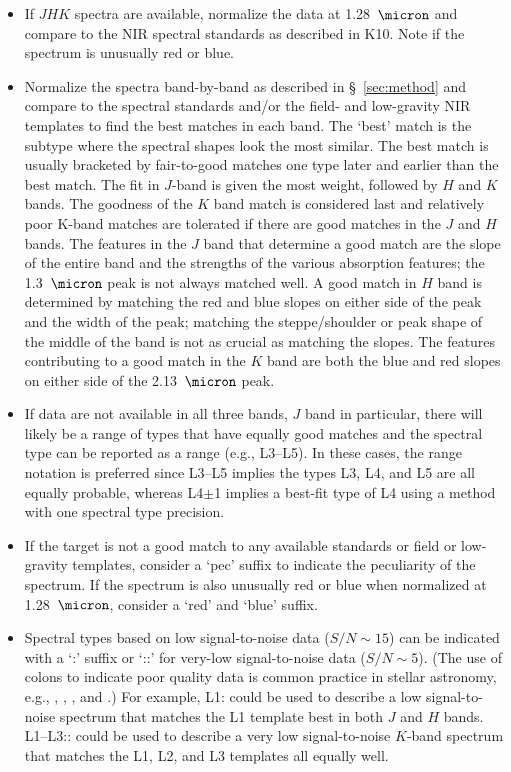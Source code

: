 \documentclass[12pt,preprint]{aastex}
\begin{document}
\begin{itemize}
	\item If $JHK$ spectra are available, normalize the data at 1.28~$\micron$ and compare to the NIR spectral standards as described in K10. Note if the spectrum is unusually red or blue.
	
	\item Normalize the spectra band-by-band as described in \S~\ref{sec:method} and compare to the spectral standards and/or the field- and low-gravity NIR templates to find the best matches in each band.
	The `best' match is the subtype where the spectral shapes look the most similar. The best match is usually bracketed by fair-to-good matches one type later and earlier than the best match.
	The fit in $J$-band is given the most weight, followed by $H$ and $K$ bands. The goodness of the $K$ band match is considered last and relatively poor K-band matches are tolerated if there are good matches in the $J$ and $H$ bands. 
	The features in the $J$ band that determine a good match are the slope of the entire band and the strengths of the various absorption features; the 1.3~$\micron$ peak is not always matched well. 
	A good match in $H$ band is determined by matching the red and blue slopes on either side of the peak and the width of the peak; matching the steppe/shoulder or peak shape of the middle of the band is not as crucial as matching the slopes. 
The features contributing to a good match in the $K$ band are both the blue and red slopes on either side of the 2.13~$\micron$ peak.	
	\item If data are not available in all three bands, $J$ band in particular, there will likely be a range of types that have equally good matches and the spectral type can be reported as a range (e.g., L3--L5). In these cases, the range notation is preferred since L3--L5 implies the types L3, L4, and L5 are all equally probable, whereas L4$\pm$1 implies a best-fit type of L4 using a method with one spectral type precision.
	\item If the target is not a good match to any available standards or field or low-gravity templates, consider a `pec' suffix to indicate the peculiarity of the spectrum. If the spectrum is also unusually red or blue when normalized at 1.28~$\micron$, consider a `red' and `blue' suffix.
	\item Spectral types based on low signal-to-noise data ($S/N\sim15$) can be indicated with a `:' suffix or `::' for very-low signal-to-noise data ($S/N\sim5$). 
	(The use of colons to indicate poor quality data is common practice in stellar astronomy, e.g., \citet{Sanduleak:1988fn}, \cite{Silvestri:2006el}, \citet[Table 12.1]{Gray:2009wd}, and \cite{Covey:2010de}.) For example, L1: could be used to describe a low signal-to-noise spectrum that matches the L1 template best in both $J$ and $H$ bands. L1--L3:: could be used to describe a very low signal-to-noise $K$-band spectrum that matches the L1, L2, and L3 templates all equally well. %

\end{itemize}	
\end{document}
